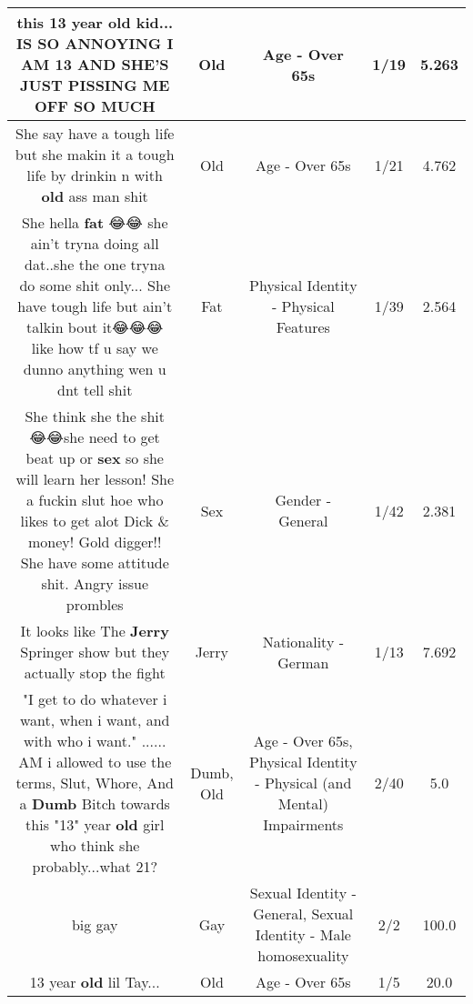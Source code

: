 \documentclass[11pt]{article}
\newlength\mylength
\begin{document}
\begin{center}
\begin{longtable}{|C{.65\mylength}|C{.30\mylength}|C{.12\mylength}|C{.12\mylength}|C{.12\mylength}|}
  \small this 13 year \textbf{old} kid... IS SO ANNOYING I AM 13 AND SHE'S JUST PISSING ME OFF SO MUCH\normalsize   & Old & Age - Over 65s & 1/19 & 5.263 \\  \hline
  \small She say have a tough life but she makin it a tough life by drinkin n with \textbf{old} ass man shit\normalsize   & Old & Age - Over 65s & 1/21 & 4.762 \\  \hline
  \small She hella \textbf{fat} 😂😂 she ain't tryna doing all dat..she the one tryna do some shit only... She have tough life but ain't talkin bout it😂😂😂 like how tf u say we dunno anything wen u dnt tell shit\normalsize   & Fat & Physical Identity - Physical Features & 1/39 & 2.564 \\  \hline
  \small She think she the shit 😂😂she need to get beat up or \textbf{sex} so she will learn her lesson! She a fuckin slut hoe who likes to get alot Dick \& money! Gold digger!! She have some attitude shit. Angry issue prombles\normalsize   & Sex & Gender - General & 1/42 & 2.381 \\  \hline
  \small It looks like The \textbf{Jerry} Springer show but they actually stop the fight\normalsize   & Jerry & Nationality - German & 1/13 & 7.692 \\  \hline
  \small "I get to do whatever i want, when i want, and with who i want." ...... AM i allowed to use the terms, Slut, Whore, And a \textbf{Dumb} Bitch towards this "13" year \textbf{old} girl who think she probably...what 21?\normalsize   & Dumb, Old & Age - Over 65s, Physical Identity - Physical (and Mental) Impairments & 2/40 & 5.0 \\  \hline
  \small big gay\normalsize   & Gay & Sexual Identity - General, Sexual Identity - Male homosexuality & 2/2 & 100.0 \\  \hline
  \small 13 year \textbf{old} lil Tay...\normalsize   & Old & Age - Over 65s & 1/5 & 20.0 \\  \hline

\end{longtable}
\end{center}
\end{document}
